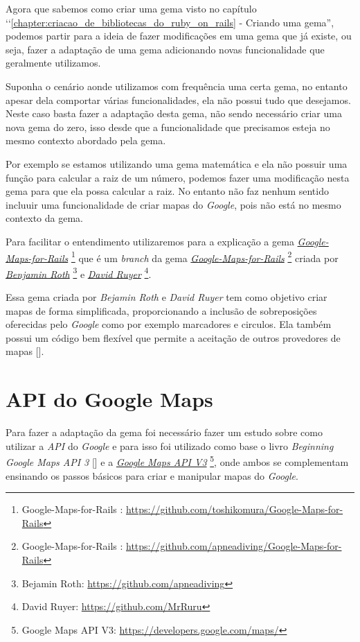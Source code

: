 Agora que sabemos como criar uma gema visto no capítulo
‘‘\ref{chapter:criacao_de_bibliotecas_do_ruby_on_rails} - Criando uma gema'', podemos partir para a
ideia de fazer modificações em uma gema que já existe, ou seja, fazer a adaptação de uma gema
adicionando novas funcionalidade que geralmente utilizamos. 

Suponha o cenário aonde utilizamos com frequência uma certa gema, no entanto apesar dela comportar várias 
funcionalidades, ela não possui tudo que desejamos. Neste caso basta fazer a adaptação desta gema, não 
sendo necessário criar uma nova gema do zero, isso desde que a funcionalidade que precisamos 
esteja no mesmo contexto abordado pela gema. 

Por exemplo se estamos utilizando uma gema matemática e ela não possuir uma função para calcular a 
raiz de um número, podemos fazer uma modificação nesta gema para que ela possa calcular a raiz. 
No entanto não faz nenhum sentido incluuir uma funcionalidade de criar mapas do \emph{Google}, pois 
não está no mesmo contexto da gema.

Para facilitar o entendimento utilizaremos para a explicação a gema 
\emph{\href{https://github.com/toshikomura/Google-Maps-for-Rails}{Google-Maps-for-Rails}} 
\footnote{Google-Maps-for-Rails : \url{https://github.com/toshikomura/Google-Maps-for-Rails}} que é um 
\emph{branch} da gema 
\emph{\href{https://github.com/apneadiving/Google-Maps-for-Rails}{Google-Maps-for-Rails}} 
\footnote{Google-Maps-for-Rails : \url{https://github.com/apneadiving/Google-Maps-for-Rails}} criada por 
\emph{\href{https://github.com/apneadiving}{Benjamin Roth}} 
\footnote{Bejamin Roth: \url{https://github.com/apneadiving}} e 
\emph{\href{https://github.com/MrRuru}{David Ruyer}} \footnote{David Ruyer: \url{https://github.com/MrRuru}}.

Essa gema criada por \emph{Bejamin Roth} e \emph{David Ruyer} tem como objetivo criar mapas de forma 
simplificada, proporcionando a inclusão de sobreposições oferecidas pelo \emph{Google} como por exemplo 
marcadores e circulos. Ela também possui um código bem flexível que permite a aceitação de outros 
provedores de mapas [].

\section{API do Google Maps} 
\label{section:api_do_google_maps} 
 
Para fazer a adaptação da gema foi necessário fazer um estudo sobre como utilizar a \emph{API} do 
\emph{Google} e para isso foi utilizado como base o livro \emph{Beginning Google Maps API 3} 
[] e a 
\emph{\href{https://developers.google.com/maps/}{Google Maps API V3}} 
\footnote{Google Maps API V3: \url{https://developers.google.com/maps/}}, onde ambos se complementam 
ensinando os passos básicos para criar e manipular mapas do \emph{Google}. 

